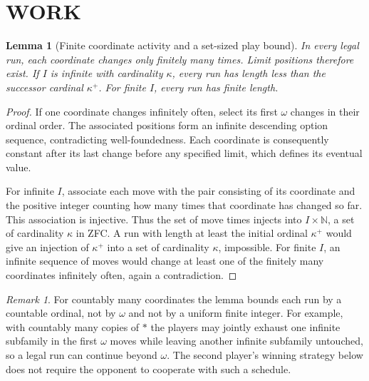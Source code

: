 \documentclass[11pt,a4paper]{article}
\newtheorem{lemma}[theorem]{Lemma}
\theoremstyle{definition}\newtheorem{definition}[theorem]{Definition}
\theoremstyle{remark}\newtheorem{remark}[theorem]{Remark}
\newcommand{\N}{\mathbb N}\newcommand{\E}{\mathbb E}
\newcommand{\1}{\mathbf 1}
\begin{document}
\section{WORK}
\begin{lemma}[Finite coordinate activity and a set-sized play bound]\label{lem:bound}
In every legal run, each coordinate changes only finitely many times. Limit positions therefore exist. If $I$ is infinite with cardinality $\kappa$, every run has length less than the successor cardinal $\kappa^+$. For finite $I$, every run has finite length.
\end{lemma}
\begin{proof}
If one coordinate changes infinitely often, select its first $\omega$ changes in their ordinal order. The associated positions form an infinite descending option sequence, contradicting well-foundedness. Each coordinate is consequently constant after its last change before any specified limit, which defines its eventual value.

For infinite $I$, associate each move with the pair consisting of its coordinate and the positive integer counting how many times that coordinate has changed so far. This association is injective. Thus the set of move times injects into $I\times\N$, a set of cardinality $\kappa$ in ZFC. A run with length at least the initial ordinal $\kappa^+$ would give an injection of $\kappa^+$ into a set of cardinality $\kappa$, impossible. For finite $I$, an infinite sequence of moves would change at least one of the finitely many coordinates infinitely often, again a contradiction.
\end{proof}

\begin{remark}
For countably many coordinates the lemma bounds each run by a countable ordinal, not by $\omega$ and not by a uniform finite integer. For example, with countably many copies of $*$ the players may jointly exhaust one infinite subfamily in the first $\omega$ moves while leaving another infinite subfamily untouched, so a legal run can continue beyond $\omega$. The second player's winning strategy below does not require the opponent to cooperate with such a schedule.
\end{remark}
\end{document}
